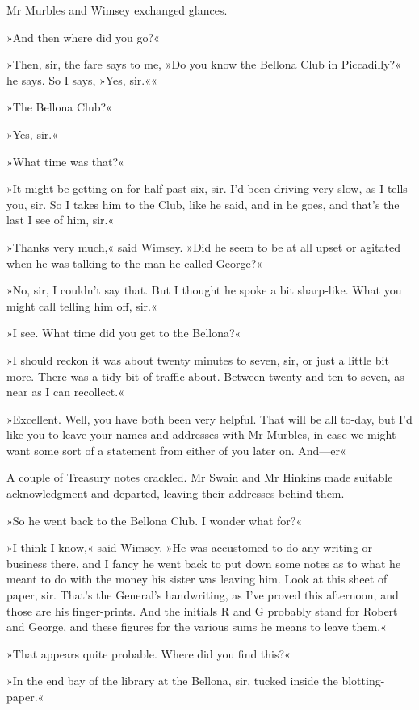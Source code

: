 Mr Murbles and Wimsey exchanged glances.

»And then where did you go?«

»Then, sir, the fare says to me, »Do you know the Bellona Club in Piccadilly?« he says. So I says, »Yes, sir.««

»The Bellona Club?«

»Yes, sir.«

»What time was that?«

»It might be getting on for half-past six, sir. I'd been driving very slow, as I tells you, sir. So I takes him to the Club, like he said, and in he goes, and that's the last I see of him, sir.«

»Thanks very much,« said Wimsey. »Did he seem to be at all upset or agitated when he was talking to the man he called George?«

»No, sir, I couldn't say that. But I thought he spoke a bit sharp-like. What you might call telling him off, sir.«

»I see. What time did you get to the Bellona?«

»I should reckon it was about twenty minutes to seven, sir, or just a little bit more. There was a tidy bit of traffic about. Between twenty and ten to seven, as near as I can recollect.«

»Excellent. Well, you have both been very helpful. That will be all to-day, but I'd like you to leave your names and addresses with Mr Murbles, in case we might want some sort of a statement from either of you later on. And—er\longdash«

A couple of Treasury notes crackled. Mr Swain and Mr Hinkins made suitable acknowledgment and departed, leaving their addresses behind them.

»So he went back to the Bellona Club. I wonder what for?«

»I think I know,« said Wimsey. »He was accustomed to do any writing or business there, and I fancy he went back to put down some notes as to what he meant to do with the money his sister was leaving him. Look at this sheet of paper, sir. That's the General's handwriting, as I've proved this afternoon, and those are his finger-prints. And the initials R and G probably stand for Robert and George, and these figures for the various sums he means to leave them.«

»That appears quite probable. Where did you find this?«

»In the end bay of the library at the Bellona, sir, tucked inside the blotting-paper.«

